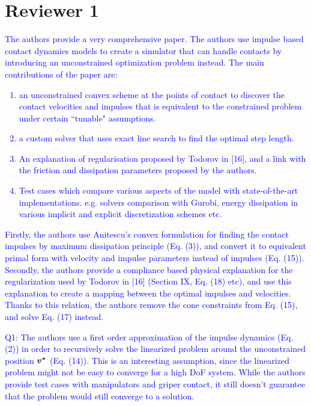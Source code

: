 \section{Reviewer 1}
\label{sec:reviewer_1}
\textcolor{blue}{
The authors provide a very comprehensive paper. The authors use impulse based
contact dynamics models to create a simulator that can handle contacts by
introducing an unconstrained optimization problem instead. The main
contributions of the paper are:
\begin{enumerate}
    \item an unconstrained convex scheme at the points of contact to discover
    the contact velocities and impulses that is equivalent to the constrained
    problem under certain ``tunable" assumptions.
    \item a custom solver that uses exact line search to find the optimal
    step length.
    \item An explanation of regularisation proposed by Todorov in [16], and
    a link with the friction and dissipation parameters proposed by the authors.
    \item Test cases which compare various aspects of the model with
    state-of-the-art implementations. e.g. solvers comparison with Gurobi,
    energy dissipation in various implicit and explicit discretization schemes
    etc.
\end{enumerate}
Firstly, the authors use Anitescu's convex formulation for finding the contact
impulses by maximum dissipation principle (Eq. (3)), and convert it to equivalent
primal form with velocity and impulse parameters instead of impulses (Eq. (15)).
Secondly, the authors provide a compliance based physical explanation for the
regularization used by Todorov in [16] (Section IX, Eq. (18) etc), and use this
explanation to create a mapping between the optimal impulses and velocities.
Thanks to this relation, the authors remove the cone constraints from Eq. (15),
and solve Eq. (17) instead.
}
\vspace{5mm}

\textcolor{blue}{
Q1: The authors use a first order approximation of the impulse dynamics (Eq. (2))
in order to recursively solve the linearized problem around the unconstrained
position ${\bm{v^*}}$ (Eq. (14)). This is an interesting assumption, since the linearized
problem might not be easy to converge for a high DoF system. While the authors
provide test cases with manipulators and griper contact, it still doesn't
guarantee that the problem would still converge to a solution.}

